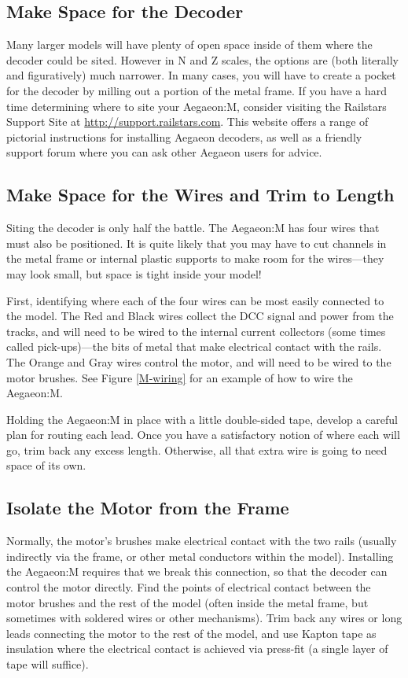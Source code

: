 \documentclass[12pt,letterpaper,draft]{memoir} %
\begin{document}
\subsection{Make Space for the Decoder}
Many larger models will have plenty of open space inside of them where the decoder could be sited. However in N and Z scales, the options are (both literally and figuratively) much narrower. In many cases, you will have to create a pocket for the decoder by milling out a portion of the metal frame. If you have a hard time determining where to site your Aegaeon:M, consider visiting the Railstars Support Site at \url{http://support.railstars.com}. This website offers a range of pictorial instructions for installing Aegaeon decoders, as well as a friendly support forum where you can ask other Aegaeon users for advice.

\subsection{Make Space for the Wires and Trim to Length}
Siting the decoder is only half the battle. The Aegaeon:M has four wires that must also be positioned. It is quite likely that you may have to cut channels in the metal frame or internal plastic supports to make room for the wires---they may look small, but space is tight inside your model!

First, identifying where each of the four wires can be most easily connected to the model. The Red and Black wires collect the DCC signal and power from the tracks, and will need to be wired to the internal current collectors (some times called pick-ups)---the bits of metal that make electrical contact with the rails. The Orange and Gray wires control the motor, and will need to be wired to the motor brushes. See Figure \ref{M-wiring} for an example of how to wire the Aegaeon:M.


Holding the Aegaeon:M in place with a little double-sided tape, develop a careful plan for routing each lead. Once you have a satisfactory notion of where each will go, trim back any excess length. Otherwise, all that extra wire is going to need space of its own.

\subsection{Isolate the Motor from the Frame}
Normally, the motor's brushes make electrical contact with the two rails (usually indirectly via the frame, or other metal conductors within the model). Installing the Aegaeon:M requires that we break this connection, so that the decoder can control the motor directly. Find the points of electrical contact between the motor brushes and the rest of the model (often inside the metal frame, but sometimes with soldered wires or other mechanisms). Trim back any wires or long leads connecting the motor to the rest of the model, and use Kapton tape as insulation where the electrical contact is achieved via press-fit (a single layer of tape will suffice).
\end{document}
